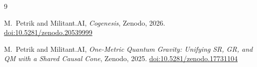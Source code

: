 \documentclass[11pt,a4paper]{article}
\begin{document}
\begin{thebibliography}{9}

M.~Petrik and Militant.AI,
\textit{Cogenesis},
Zenodo, 2026.
\href{https://doi.org/10.5281/zenodo.20539999}{doi:10.5281/zenodo.20539999}

M.~Petrik and Militant.AI,
\textit{One-Metric Quantum Gravity: Unifying SR, GR, and QM with a Shared Causal Cone},
Zenodo, 2025.
\href{https://doi.org/10.5281/zenodo.17731104}{doi:10.5281/zenodo.17731104}

\end{thebibliography}
\end{document}
